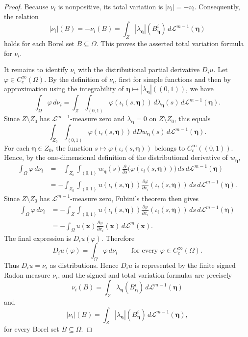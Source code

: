 \documentclass{publicadapt}
\begin{document}
\begin{proof}
Because \(\nu_i\) is nonpositive, its total variation is \(|\nu_i|=-\nu_i\).
Consequently,  
 the relation $$
|\nu_i|(B)
=
-\nu_i(B)
=
\int_Z
|\lambda_{\boldsymbol\eta}|(B_{\boldsymbol\eta}^{i})
\,d\mathcal L^{m-1}(\boldsymbol\eta) 
$$
 holds for each Borel set \(B\subseteq\Omega\). 
 This proves the asserted total variation formula for \(\nu_i\).

It remains to identify \(\nu_i\) with the distributional partial derivative
\(D_i u\). Let \(\varphi\in C_c^\infty(\Omega)\). By the definition of
\(\nu_i\), first for simple functions and then by approximation using the
integrability of
\(\boldsymbol\eta\mapsto |\lambda_{\boldsymbol\eta}|((0,1))\), we have
\[
\int_\Omega \varphi\,d\nu_i
=
\int_Z
\int_{(0,1)}
\varphi(\iota_i(s,\boldsymbol\eta))
\,d\lambda_{\boldsymbol\eta}(s)
\,d\mathcal L^{m-1}(\boldsymbol\eta).
\]
Since \(Z\setminus Z_0\) has \(\mathcal L^{m-1}\)-measure zero and
\(\lambda_{\boldsymbol\eta}=0\) on \(Z\setminus Z_0\), this equals
\[
\int_{Z_0}
\int_{(0,1)}
\varphi(\iota_i(s,\boldsymbol\eta))
\,dDw_{\boldsymbol\eta}(s)
\,d\mathcal L^{m-1}(\boldsymbol\eta).
\]
For each \(\boldsymbol\eta\in Z_0\), the function
$
s\mapsto \varphi(\iota_i(s,\boldsymbol\eta))
$ 
belongs to \(C_c^\infty((0,1))\). Hence, by the one-dimensional definition of
the distributional derivative of \(w_{\boldsymbol\eta}\),
\[
\begin{aligned}
\int_\Omega \varphi\,d\nu_i
&=
-\int_{Z_0}
\int_{(0,1)}
w_{\boldsymbol\eta}(s)
\frac{\partial}{\partial s}
\bigl(\varphi(\iota_i(s,\boldsymbol\eta))\bigr)
\,ds\,d\mathcal L^{m-1}(\boldsymbol\eta) \\[4pt]
&=
-\int_{Z_0}
\int_{(0,1)}
u(\iota_i(s,\boldsymbol\eta))
\frac{\partial\varphi}{\partial x_i}
(\iota_i(s,\boldsymbol\eta))
\,ds\,d\mathcal L^{m-1}(\boldsymbol\eta).
\end{aligned}
\]
Since \(Z\setminus Z_0\) has \(\mathcal L^{m-1}\)-measure zero, Fubini's theorem
then gives
\[
\begin{aligned}
\int_\Omega \varphi\,d\nu_i
&=
-\int_Z
\int_{(0,1)}
u(\iota_i(s,\boldsymbol\eta))
\frac{\partial\varphi}{\partial x_i}
(\iota_i(s,\boldsymbol\eta))
\,ds\,d\mathcal L^{m-1}(\boldsymbol\eta) \\[4pt]
&=
-\int_\Omega
u(\mathbf x)\frac{\partial\varphi}{\partial x_i}(\mathbf x)
\,d\mathcal L^m(\mathbf x).
\end{aligned}
\]
The final expression is \(D_i u(\varphi)\). Therefore
\[
D_i u(\varphi)=\int_\Omega \varphi\,d\nu_i
\qquad
\text{for every } \varphi\in C_c^\infty(\Omega).
\]
Thus \(D_i u=\nu_i\) as distributions. Hence \(D_i u\) is represented by the
finite signed Radon measure \(\nu_i\), and the signed and total variation
formulas are precisely
\[
\nu_i(B)
=
\int_Z
\lambda_{\boldsymbol\eta}(B_{\boldsymbol\eta}^{i})
\,d\mathcal L^{m-1}(\boldsymbol\eta)
\]
and
\[
|\nu_i|(B)
=
\int_Z
|\lambda_{\boldsymbol\eta}|(B_{\boldsymbol\eta}^{i})
\,d\mathcal L^{m-1}(\boldsymbol\eta),
\]
for every Borel set \(B\subseteq\Omega\).
\end{proof}
\end{document}
